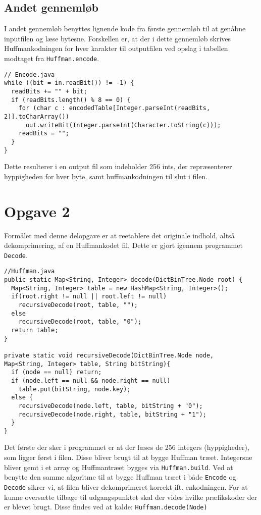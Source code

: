 \documentclass{article}
\begin{document}
\subsection*{Andet gennemløb}
I andet gennemløb benyttes lignende kode fra første gennemløb til at genåbne inputfilen og læse bytesne. Forskellen er, at der i dette gennemløb skrives Huffmankodningen for hver karakter til outputfilen ved opslag i tabellen modtaget fra \texttt{Huffman.encode}.

\begin{lstlisting}
// Encode.java
while ((bit = in.readBit()) != -1) {
  readBits += "" + bit;
  if (readBits.length() % 8 == 0) {
    for (char c : encodedTable[Integer.parseInt(readBits, 2)].toCharArray())
      out.writeBit(Integer.parseInt(Character.toString(c)));
    readBits = "";
  }
}
\end{lstlisting}

Dette resulterer i en output fil som indeholder 256 ints, der repræsenterer hyppigheden for hver byte, samt huffmankodningen til slut i filen.

\section*{Opgave 2}
Formålet med denne delopgave er at reetablere det originale indhold, altså dekomprimering, af en Huffmankodet fil. Dette er gjort igennem programmet \texttt{Decode}.

\begin{lstlisting}
//Huffman.java
public static Map<String, Integer> decode(DictBinTree.Node root) {
  Map<String, Integer> table = new HashMap<String, Integer>();
  if(root.right != null || root.left != null)
    recursiveDecode(root, table, "");
  else
    recursiveDecode(root, table, "0");
  return table;
}

private static void recursiveDecode(DictBinTree.Node node, 
Map<String, Integer> table, String bitString){
  if (node == null) return;
  if (node.left == null && node.right == null)
    table.put(bitString, node.key);
  else {
    recursiveDecode(node.left, table, bitString + "0");
    recursiveDecode(node.right, table, bitString + "1");
  }
}
\end{lstlisting}

Det første der sker i programmet er at der læses de 256 integers (hyppigheder), som ligger først i filen. Disse bliver brugt til at bygge Huffman træet. Integersne bliver gemt i et array og Huffmantræet bygges via \texttt{Huffman.build}. Ved at benytte den samme algoritme til at bygge Huffman træet i både \texttt{Encode} og \texttt{Decode} sikrer vi, at filen bliver dekomprimeret korrekt ift. enkodningen. 
For at kunne oversætte tilbage til udgangspunktet skal der vides hvilke præfikskoder der er blevet brugt. Disse findes ved at kalde: \texttt{Huffman.decode(Node)}
\end{document}

